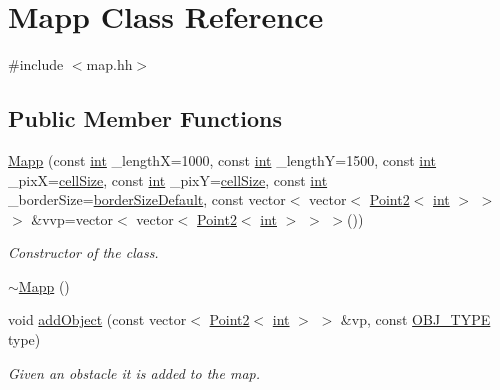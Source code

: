 \hypertarget{class_mapp}{}\section{Mapp Class Reference}
\label{class_mapp}


{\ttfamily \#include $<$map.\+hh$>$}

\subsection*{Public Member Functions}
\begin{DoxyCompactItemize}
\item 
\mbox{\hyperlink{class_mapp_a748ffcb20519591210f19458c90f482a}{Mapp}} (const \mbox{\hyperlink{draw_8hh_aa620a13339ac3a1177c86edc549fda9b}{int}} \+\_\+lengthX=1000, const \mbox{\hyperlink{draw_8hh_aa620a13339ac3a1177c86edc549fda9b}{int}} \+\_\+lengthY=1500, const \mbox{\hyperlink{draw_8hh_aa620a13339ac3a1177c86edc549fda9b}{int}} \+\_\+pixX=\mbox{\hyperlink{class_mapp_a8216044ff8e95ba054985e26ae1c75f8}{cell\+Size}}, const \mbox{\hyperlink{draw_8hh_aa620a13339ac3a1177c86edc549fda9b}{int}} \+\_\+pixY=\mbox{\hyperlink{class_mapp_a8216044ff8e95ba054985e26ae1c75f8}{cell\+Size}}, const \mbox{\hyperlink{draw_8hh_aa620a13339ac3a1177c86edc549fda9b}{int}} \+\_\+border\+Size=\mbox{\hyperlink{class_mapp_aef8bde83114714a4ce4ad9d13766e761}{border\+Size\+Default}}, const vector$<$ vector$<$ \mbox{\hyperlink{class_point2}{Point2}}$<$ \mbox{\hyperlink{draw_8hh_aa620a13339ac3a1177c86edc549fda9b}{int}} $>$ $>$ $>$ \&vvp=vector$<$ vector$<$ \mbox{\hyperlink{class_point2}{Point2}}$<$ \mbox{\hyperlink{draw_8hh_aa620a13339ac3a1177c86edc549fda9b}{int}} $>$ $>$ $>$())
\begin{DoxyCompactList}\small\item\em Constructor of the class. \end{DoxyCompactList}\item 
\mbox{\hyperlink{class_mapp_ac213a283850079e3facfae146fc22b8b}{$\sim$\+Mapp}} ()
\item 
void \mbox{\hyperlink{class_mapp_ad480beefb37fe0e3cab870fea0a4a1f7}{add\+Object}} (const vector$<$ \mbox{\hyperlink{class_point2}{Point2}}$<$ \mbox{\hyperlink{draw_8hh_aa620a13339ac3a1177c86edc549fda9b}{int}} $>$ $>$ \&vp, const \mbox{\hyperlink{map_8hh_a714b9c2c276fbae637fee36453d9121e}{O\+B\+J\+\_\+\+T\+Y\+PE}} type)
\begin{DoxyCompactList}\small\item\em Given an obstacle it is added to the map. \end{DoxyCompactList}\item 

\end{DoxyCompactItemize}

